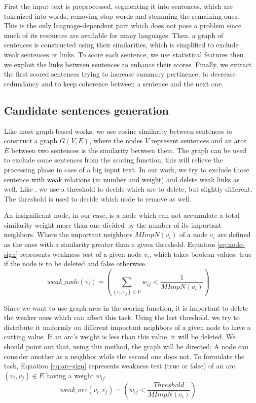\documentclass[12pt, oneside, a4paper]{article}
\begin{document}
First the input text is preprocessed, segmenting it into sentences, which are tokenized into words, removing stop words and stemming the remaining ones. 
This is the only language-dependent part which does not pose a problem since much of its resources are available for many languages. 
Then, a graph of sentences is constructed using their similarities, which is simplified to exclude weak sentences or links. 
To score each sentence, we use statistical features then we exploit the links between sentences to enhance their scores. 
Finally, we extract the first scored sentences trying to increase summary pertinence, to decrease redundancy and to keep coherence between a sentence and the next one.

\subsection{Candidate sentences generation}

Like most graph-based works, we use cosine similarity between sentences to construct a graph $ G(V, E) $, where the nodes $ V $ represent sentences and an arcs $ E $ between two sentences is the similarity between them. 
The graph can be used to exclude some sentences from the scoring function, this will relieve the processing phase in case of a big input text. 
In our work, we try to exclude those sentence with weak relations (in number and weight) and delete weak links as well. 
Like \citet{04-erkan-radev}, we use a threshold to decide which arc to delete, but slightly different. 
The threshold is used to decide which node to remove as well.

An insignificant node, in our case, is a node which can not accumulate a total similarity weight more than one divided by the number of its important neighbors. 
Where the important neighbors $ MImpN(v_i) $ of a node $ v_i $ are defined as the ones with a similarity greater than a given threshold.
Equation \ref{eq:node-sign} represents weakness test of a given node $ v_i $, which takes boolean values: true if the node is to be deleted and false otherwise.
\begin{equation}
weak\_node(v_i) = ( \sum_{(v_i, v_j) \in E} w_{ij} < \frac{1}{MImpN(v_i)} )
\label{eq:node-sign}
\end{equation}

Since we want to use graph arcs in the scoring function, it is important to delete the weaker ones which can affect this task. 
Using the last threshold, we try to distribute it uniformly on different important neighbors of a given node to have a cutting value.
If an arc's weight is less than this value, it will be deleted. 
We should point out that, using this method, the graph will be directed; A node can consider another as a neighbor while the second one does not.
To formulate the task, Equation \ref{eq:arc-sign} represents weakness test (true or false) of an arc $ (v_i, v_j) \in E$ having a weight $ w_{ij} $.
\begin{equation}
weak\_arc(v_i, v_j) = ( w_{ij} < \frac{Threshold}{MImpN(v_i)} )
\label{eq:arc-sign}
\end{equation}
\end{document}
